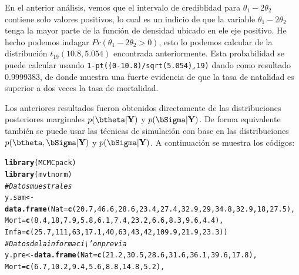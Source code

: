 \documentclass[10pt,openright]{book}\usepackage[]{graphicx}\usepackage[]{color}
\makeatletter
\newcommand{\hlnum}[1]{\textcolor[rgb]{0.686,0.059,0.569}{#1}}%
\newcommand{\hlcom}[1]{\textcolor[rgb]{0.678,0.584,0.686}{\textit{#1}}}%
\newcommand{\hlstd}[1]{\textcolor[rgb]{0.345,0.345,0.345}{#1}}%
\newcommand{\hlkwb}[1]{\textcolor[rgb]{0.69,0.353,0.396}{#1}}%
\newcommand{\hlkwc}[1]{\textcolor[rgb]{0.333,0.667,0.333}{#1}}%
\newcommand{\hlkwd}[1]{\textcolor[rgb]{0.737,0.353,0.396}{\textbf{#1}}}%
\newenvironment{kframe}{%
 \def\at@end@of@kframe{}%
 \ifinner\ifhmode%
  \def\at@end@of@kframe{\end{minipage}}%
  \begin{minipage}{\columnwidth}%
 \fi\fi%
 \def\FrameCommand##1{\hskip\@totalleftmargin \hskip-\fboxsep
 \colorbox{shadecolor}{##1}\hskip-\fboxsep
     \hskip-\linewidth \hskip-\@totalleftmargin \hskip\columnwidth}%
 \MakeFramed {\advance\hsize-\width
   \@totalleftmargin\z@ \linewidth\hsize
   \@setminipage}}%
 {\par\unskip\endMakeFramed%
 \at@end@of@kframe}
\newenvironment{knitrout}{}{} %
\makeatother
\begin{document}
\begin{Eje}
En el anterior an\'alisis, vemos que el intervalo de crediblidad para $\theta_1-2\theta_2$ contiene solo valores positivos, lo cual es un indicio de que la variable $\theta_1-2\theta_2$ tenga la mayor parte de la funci\'on de densidad ubicado en ele eje positivo. He hecho podemos indagar $Pr(\theta_1-2\theta_2>0)$, esto lo podemos calcular de la distribuci\'on $t_{19}(10.8, 5.054)$ encontrada anteriormente. Esta probabilidad se puede calcular usando \verb'1-pt((0-10.8)/sqrt(5.054),19)' dando como resultado 0.9999383, de donde muestra una fuerte evidencia de que la tasa de natalidad es superior a dos veces la tasa de mortalidad.

Los anteriores resultados fueron obtenidos directamente de las distribuciones posteriores marginales $p(\btheta|\mathbf{Y})$ y $p(\bSigma|\mathbf{Y})$. De forma equivalente tambi\'en se puede usar las t\'ecnicas de simulaci\'on con base en las distribuciones $p(\btheta,\bSigma|\mathbf{Y})$ y $p(\bSigma|\mathbf{Y})$. A continuaci\'on se muestra los c\'odigos:
\begin{knitrout}
\color{fgcolor}\begin{kframe}
\begin{alltt}
\hlkwd{library}\hlstd{(MCMCpack)}
\hlkwd{library}\hlstd{(mvtnorm)}
\hlcom{# Datos muestrales}
\hlstd{y.sam} \hlkwb{<-} \hlkwd{data.frame}\hlstd{(}\hlkwc{Nat}\hlstd{=}\hlkwd{c}\hlstd{(}\hlnum{20.7}\hlstd{,}\hlnum{46.6}\hlstd{,} \hlnum{28.6}\hlstd{,}\hlnum{23.4}\hlstd{,}\hlnum{27.4}\hlstd{,}\hlnum{32.9}\hlstd{,}\hlnum{29}\hlstd{,}\hlnum{34.8}\hlstd{,}\hlnum{32.9}\hlstd{,}\hlnum{18}\hlstd{,}\hlnum{27.5}\hlstd{),}
             \hlkwc{Mort}\hlstd{=}\hlkwd{c}\hlstd{(}\hlnum{8.4}\hlstd{,}\hlnum{18}\hlstd{,}\hlnum{7.9}\hlstd{,}\hlnum{5.8}\hlstd{,}\hlnum{6.1}\hlstd{,}\hlnum{7.4}\hlstd{,}\hlnum{23.2}\hlstd{,}\hlnum{6.6}\hlstd{,}\hlnum{8.3}\hlstd{,}\hlnum{9.6}\hlstd{,}\hlnum{4.4}\hlstd{),}
                \hlkwc{Infa}\hlstd{=}\hlkwd{c}\hlstd{(}\hlnum{25.7}\hlstd{,}\hlnum{111}\hlstd{,}\hlnum{63}\hlstd{,}\hlnum{17.1}\hlstd{,}\hlnum{40}\hlstd{,}\hlnum{63}\hlstd{,}\hlnum{43}\hlstd{,}\hlnum{42}\hlstd{,}\hlnum{109.9}\hlstd{,}\hlnum{21.9}\hlstd{,}\hlnum{23.3}\hlstd{))}
\hlcom{# Datos de la informaci\textbackslash{}'on previa}
\hlstd{y.pre} \hlkwb{<-} \hlkwd{data.frame}\hlstd{(}\hlkwc{Nat}\hlstd{=}\hlkwd{c}\hlstd{(}\hlnum{21.2}\hlstd{,}\hlnum{30.5}\hlstd{,}\hlnum{28.6}\hlstd{,}\hlnum{31.6}\hlstd{,}\hlnum{36.1}\hlstd{,}\hlnum{39.6}\hlstd{,}\hlnum{17.8}\hlstd{),}
                        \hlkwc{Mort}\hlstd{=}\hlkwd{c}\hlstd{(}\hlnum{6.7}\hlstd{,}\hlnum{10.2}\hlstd{,}\hlnum{9.4}\hlstd{,}\hlnum{5.6}\hlstd{,}\hlnum{8.8}\hlstd{,}\hlnum{14.8}\hlstd{,}\hlnum{5.2}\hlstd{),}

\end{alltt}
\end{kframe}
\end{knitrout}
\end{Eje}
\end{document}
